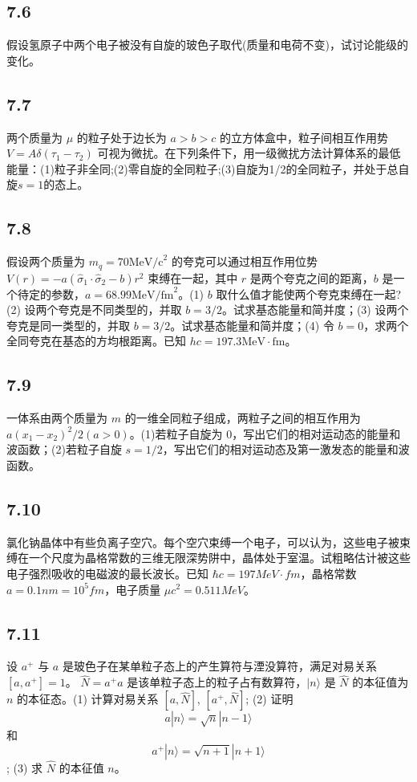 \subsection{7.6}
假设氢原子中两个电子被没有自旋的玻色子取代(质量和电荷不变)，试讨论能级的变化。

\subsection{7.7}
两个质量为 $\mu$ 的粒子处于边长为 $a > b > c$ 的立方体盒中，粒子间相互作用势 $V = A\delta (\tau_1 - \tau_2)$ 可视为微扰。在下列条件下，用一级微扰方法计算体系的最低能量：(1)粒子非全同;(2)零自旋的全同粒子;(3)自旋为1/2的全同粒子，并处于总自旋$s=1$的态上。

\subsection{7.8}
假设两个质量为 $m_q = 70  \text{MeV/c}^2$ 的夸克可以通过相互作用位势 $V(r) = -a(\hat{\sigma}_1 \cdot \hat{\sigma}_2 - b)r^2$ 束缚在一起，其中 $r$ 是两个夸克之间的距离，$b$ 是一个待定的参数，$a = 68.99  \text{MeV/fm}^2$。(1) $b$ 取什么值才能使两个夸克束缚在一起? (2) 设两个夸克是不同类型的，并取 $b = 3/2$。试求基态能量和简并度；(3) 设两个夸克是同一类型的，并取 $b = 3/2$。试求基态能量和简并度；(4) 令 $b = 0$，求两个全同夸克在基态的方均根距离。已知 $hc = 197.3  \text{MeV} \cdot \text{fm}$。

\subsection{7.9}
一体系由两个质量为 $m$ 的一维全同粒子组成，两粒子之间的相互作用为 $a(x_1 - x_2)^2 / 2 (a > 0)$。(1)若粒子自旋为 0，写出它们的相对运动态的能量和波函数；(2)若粒子自旋 $s = 1/2$，写出它们的相对运动态及第一激发态的能量和波函数。

\subsection{7.10}
氯化钠晶体中有些负离子空穴。每个空穴束缚一个电子，可以认为，这些电子被束缚在一个尺度为晶格常数的三维无限深势阱中，晶体处于室温。试粗略估计被这些电子强烈吸收的电磁波的最长波长。已知 $\hbar c = 197MeV \cdot fm$，晶格常数 $a = 0.1nm = 10^5fm$，电子质量 $\mu c^2 = 0.511MeV$。

\subsection{7.11}
设 $a^+$ 与 $a$ 是玻色子在某单粒子态上的产生算符与湮没算符，满足对易关系 $[a, a^+] = 1$。 $\hat{N} = a^+ a$ 是该单粒子态上的粒子占有数算符，$|n\rangle$ 是 $\hat{N}$ 的本征值为 $n$ 的本征态。(1) 计算对易关系 $[a, \hat{N}]$, $[a^+, \hat{N}]$; (2) 证明 $$a | n \rangle = \sqrt{n} | n - 1 \rangle$$ 和 $$a^+ | n \rangle = \sqrt{n + 1} | n + 1 \rangle$$; (3) 求 $\hat{N}$ 的本征值 $n$。

